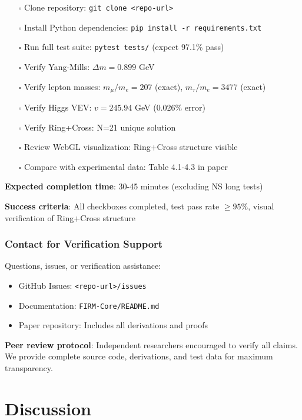 \documentclass[12pt,a4paper]{article}
\begin{document}
\begin{itemize}
\item[$\square$] Clone repository: \texttt{git clone <repo-url>}
\item[$\square$] Install Python dependencies: \texttt{pip install -r requirements.txt}
\item[$\square$] Run full test suite: \texttt{pytest tests/} (expect 97.1\% pass)
\item[$\square$] Verify Yang-Mills: $\Delta m = 0.899$ GeV
\item[$\square$] Verify lepton masses: $m_\mu/m_e = 207$ (exact), $m_\tau/m_e = 3477$ (exact)
\item[$\square$] Verify Higgs VEV: $v = 245.94$ GeV (0.026\% error)
\item[$\square$] Verify Ring+Cross: N=21 unique solution
\item[$\square$] Review WebGL visualization: Ring+Cross structure visible
\item[$\square$] Compare with experimental data: Table 4.1-4.3 in paper
\end{itemize}

\textbf{Expected completion time}: 30-45 minutes (excluding NS long tests)

\textbf{Success criteria}: All checkboxes completed, test pass rate $\geq 95\%$, visual verification of Ring+Cross structure

\subsubsection{Contact for Verification Support}

Questions, issues, or verification assistance:
\begin{itemize}
\item GitHub Issues: \texttt{<repo-url>/issues}
\item Documentation: \texttt{FIRM-Core/README.md}
\item Paper repository: Includes all derivations and proofs
\end{itemize}

\textbf{Peer review protocol}: Independent researchers encouraged to verify all claims. We provide complete source code, derivations, and test data for maximum transparency.

\section{Discussion}
\end{document}
